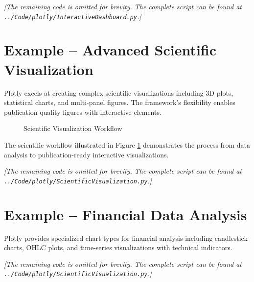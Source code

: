 

\noindent\textit{[The remaining code is omitted for brevity. The complete script can be found at \texttt{../Code/plotly/InteractiveDashboard.py}.]}

\section{Example -- Advanced Scientific Visualization}
\label{sec:scientific_example}

Plotly excels at creating complex scientific visualizations including 3D plots, statistical charts, and multi-panel figures. The framework's flexibility enables publication-quality figures with interactive elements.

\begin{figure}[htbp]
	\centering
    
	\caption{Scientific Visualization Workflow}
	\label{fig:scientific_workflow}
\end{figure}

The scientific workflow illustrated in Figure \ref{fig:scientific_workflow} demonstrates the process from data analysis to publication-ready interactive visualizations.



\noindent\textit{[The remaining code is omitted for brevity. The complete script can be found at \texttt{../Code/plotly/ScientificVisualization.py}.]}

\section{Example -- Financial Data Analysis}
\label{sec:financial_example}

Plotly provides specialized chart types for financial analysis including candlestick charts, OHLC plots, and time-series visualizations with technical indicators.



\noindent\textit{[The remaining code is omitted for brevity. The complete script can be found at \texttt{../Code/plotly/ScientificVisualization.py}.]}

